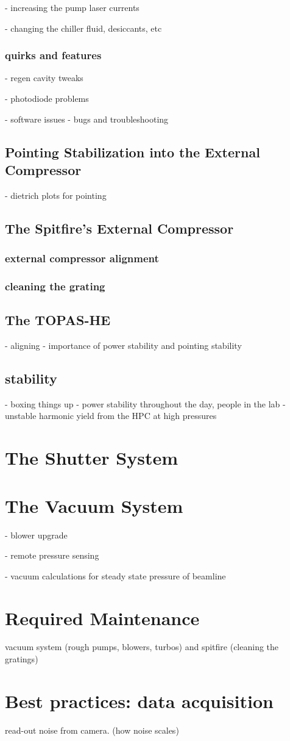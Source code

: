 - increasing the pump laser currents

- changing the chiller fluid, desiccants, etc

\subsubsection{quirks and features}
- regen cavity tweaks

- photodiode problems

- software issues - bugs and troubleshooting

\subsection{Pointing Stabilization into the External Compressor}
- dietrich plots for pointing
\subsection{The Spitfire's External Compressor}
\subsubsection{external compressor alignment}
\subsubsection{cleaning the grating}

\subsection{The TOPAS-HE}
- aligning
- importance of power stability and pointing stability

\subsection{stability}
- boxing things up
- power stability throughout the day, people in the lab
- unstable harmonic yield from the HPC at high pressures
\section{The Shutter System}

\section{The Vacuum System}
- blower upgrade

- remote pressure sensing

- vacuum calculations for steady state pressure of beamline

\section{Required Maintenance}

vacuum system (rough pumps, blowers, turbos) and spitfire (cleaning the gratings)

\section{Best practices: data acquisition}

read-out noise from camera. (how noise scales)

